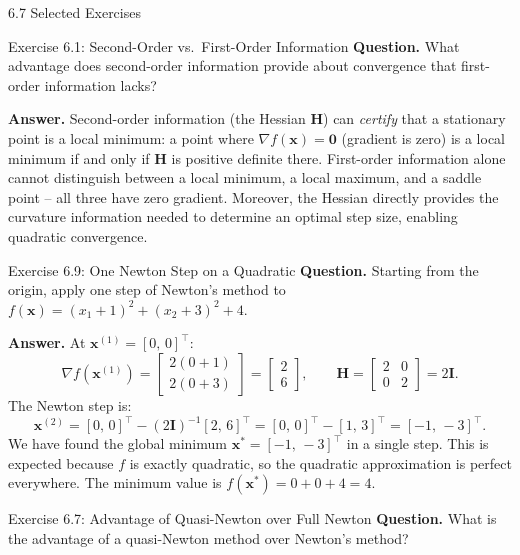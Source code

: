 \documentclass[aspectratio=169,10pt]{beamer}
\newcommand{\xbf}{\mathbf{x}}
\newcommand{\Hbf}{\mathbf{H}}
\newcommand{\Ibf}{\mathbf{I}}
\begin{document}
\begin{frame}[allowframebreaks]{6.7 Selected Exercises}

  \begin{block}{Exercise 6.1: Second-Order vs.\ First-Order Information}
    \textbf{Question.} What advantage does second-order information provide about
    convergence that first-order information lacks?

    \medskip
    \textbf{Answer.} Second-order information (the Hessian $\Hbf$) can
    \emph{certify} that a stationary point is a local minimum: a point where
    $\nabla f(\xbf) = \mathbf{0}$ (gradient is zero) is a local minimum if and
    only if $\Hbf$ is positive definite there.  First-order information alone
    cannot distinguish between a local minimum, a local maximum, and a saddle
    point -- all three have zero gradient.  Moreover, the Hessian directly
    provides the curvature information needed to determine an optimal step size,
    enabling quadratic convergence.
  \end{block}

  \begin{block}{Exercise 6.9: One Newton Step on a Quadratic}
    \textbf{Question.} Starting from the origin, apply one step of Newton's method
    to $f(\xbf) = (x_1+1)^2 + (x_2+3)^2 + 4$.

    \medskip
    \textbf{Answer.} At $\xbf^{(1)} = [0,\,0]^\top$:
    \[
      \nabla f(\xbf^{(1)}) = \begin{bmatrix}2(0+1)\\2(0+3)\end{bmatrix}
                            = \begin{bmatrix}2\\6\end{bmatrix},
      \qquad
      \Hbf = \begin{bmatrix}2&0\\0&2\end{bmatrix} = 2\Ibf.
    \]
    The Newton step is:
    \[
      \xbf^{(2)} = [0,\,0]^\top - (2\Ibf)^{-1}[2,\,6]^\top
                 = [0,\,0]^\top - [1,\,3]^\top = [-1,\,-3]^\top.
    \]
    We have found the global minimum $\xbf^* = [-1,\,-3]^\top$ in a single step.
    This is expected because $f$ is exactly quadratic, so the quadratic
    approximation is perfect everywhere.  The minimum value is $f(\xbf^*) =
    0 + 0 + 4 = 4$.
  \end{block}

  \framebreak

  \begin{block}{Exercise 6.7: Advantage of Quasi-Newton over Full Newton}
    \textbf{Question.} What is the advantage of a quasi-Newton method over
    Newton's method?


\end{block}
\end{frame}
\end{document}
